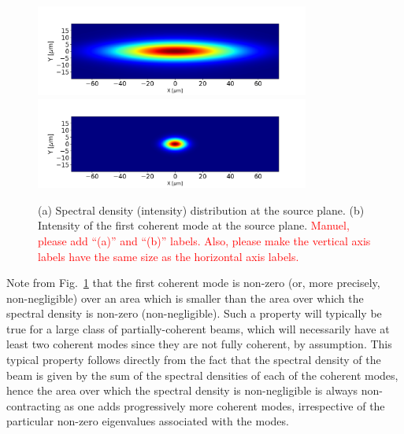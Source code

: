 \documentclass[%
 reprint,
 amsmath,amssymb,
 aps,
]{revtex4-1}
\begin{document}
\begin{figure}%
\includegraphics[width=9.0cm]{Figures/spectral_density_upto1099.png}
\includegraphics[width=9.0cm]{Figures/spectral_density_upto0.png}
\caption{(a) Spectral density (intensity) distribution at the source plane. (b) Intensity of the first coherent mode at the source plane. \textcolor{red}{Manuel, please add ``(a)'' and ``(b)'' labels.  Also, please make the vertical axis labels have the same size as the horizontal axis labels.}}
\label{spectral_density}
\end{figure}

Note from Fig.~\ref{spectral_density} that the first coherent mode is non-zero (or, more precisely, non-negligible) over an area which is smaller than the area over which the spectral density is non-zero (non-negligible). Such a property will typically be true for a large class of partially-coherent beams, which will necessarily have at least two coherent modes since they are not fully coherent, by assumption.  This typical property follows directly from the fact that the spectral density of the beam is given by the sum of the spectral densities of each of the coherent modes, hence the area over which the spectral density is non-negligible is always non-contracting as one adds progressively more coherent modes, irrespective of the particular non-zero eigenvalues associated with the modes.  
\end{document}
